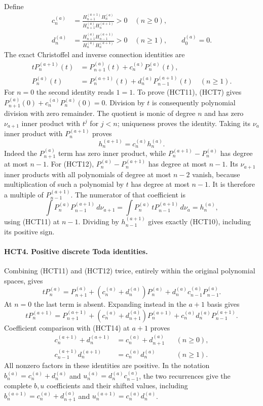 \documentclass[11pt,a4paper]{article}
\begin{document}
Define
\begin{align}
 c_n^{(a)}&=\frac{H_{n+1}^{(a+1)}H_n^{(a)}}
 {H_{n+1}^{(a)}H_n^{(a+1)}}>0 \quad(n\geq0),\tag{HCT9}\\
 d_n^{(a)}&=\frac{H_{n+1}^{(a)}H_{n-1}^{(a+1)}}
 {H_n^{(a)}H_n^{(a+1)}}>0 \quad(n\geq1),\qquad d_0^{(a)}=0.\tag{HCT10}
\end{align}
The exact Christoffel and inverse connection identities are
\begin{align}
 tP_n^{(a+1)}(t)&=P_{n+1}^{(a)}(t)+c_n^{(a)}P_n^{(a)}(t),\tag{HCT11}\\
 P_n^{(a)}(t)&=P_n^{(a+1)}(t)+d_n^{(a)}P_{n-1}^{(a+1)}(t)
 \quad(n\geq1).\tag{HCT12}
\end{align}
For $n=0$ the second identity reads $1=1$.
To prove (HCT11), (HCT7) gives
$P_{n+1}^{(a)}(0)+c_n^{(a)}P_n^{(a)}(0)=0$.
Division by $t$ is consequently polynomial division with zero
remainder. The quotient is monic of degree $n$ and has zero
$\nu_{a+1}$ inner product with $t^j$ for $j<n$; uniqueness proves
the identity. Taking its $\nu_a$ inner product with
$P_n^{(a+1)}$ proves
\begin{equation}\tag{HCT13}
 h_n^{(a+1)}=c_n^{(a)}h_n^{(a)}.
\end{equation}
Indeed the $P_{n+1}^{(a)}$ term has zero inner product, while
$P_n^{(a+1)}-P_n^{(a)}$ has degree at most $n-1$.
For (HCT12), $P_n^{(a)}-P_n^{(a+1)}$ has degree at most $n-1$.
Its $\nu_{a+1}$ inner products with all polynomials of degree at
most $n-2$ vanish, because multiplication of such a polynomial by
$t$ has degree at most $n-1$. It is therefore a multiple of
$P_{n-1}^{(a+1)}$. The numerator of that coefficient is
\[
 \int P_n^{(a)}P_{n-1}^{(a+1)}\,d\nu_{a+1}
 =\int P_n^{(a)}\,tP_{n-1}^{(a+1)}\,d\nu_a=h_n^{(a)},
\]
using (HCT11) at $n-1$. Dividing by $h_{n-1}^{(a+1)}$ gives
exactly (HCT10), including its positive sign.

\paragraph{HCT4. Positive discrete Toda identities.}
Combining (HCT11) and (HCT12) twice, entirely within the original
polynomial spaces, gives
\begin{equation}\tag{HCT14}
 tP_n^{(a)}=P_{n+1}^{(a)}+
 (c_n^{(a)}+d_n^{(a)})P_n^{(a)}
 +d_n^{(a)}c_{n-1}^{(a)}P_{n-1}^{(a)}.
\end{equation}
At $n=0$ the last term is absent. Expanding instead in the
$a+1$ basis gives
\[
 tP_n^{(a+1)}=P_{n+1}^{(a+1)}+
 (c_n^{(a)}+d_{n+1}^{(a)})P_n^{(a+1)}
 +c_n^{(a)}d_n^{(a)}P_{n-1}^{(a+1)}.
\]
Coefficient comparison with (HCT14) at $a+1$ proves
\begin{align}
 c_n^{(a+1)}+d_n^{(a+1)}
 &=c_n^{(a)}+d_{n+1}^{(a)} &&(n\geq0),\tag{HCT15}\\
 c_{n-1}^{(a+1)}d_n^{(a+1)}
 &=c_n^{(a)}d_n^{(a)} &&(n\geq1).\tag{HCT16}
\end{align}
All nonzero factors in these identities are positive. In the
notation $b_n^{(a)}=c_n^{(a)}+d_n^{(a)}$ and
$u_n^{(a)}=d_n^{(a)}c_{n-1}^{(a)}$, the two recurrences give the
complete $b,u$ coefficients and their shifted values, including
$b_n^{(a+1)}=c_n^{(a)}+d_{n+1}^{(a)}$ and
$u_n^{(a+1)}=c_n^{(a)}d_n^{(a)}$.
\end{document}
